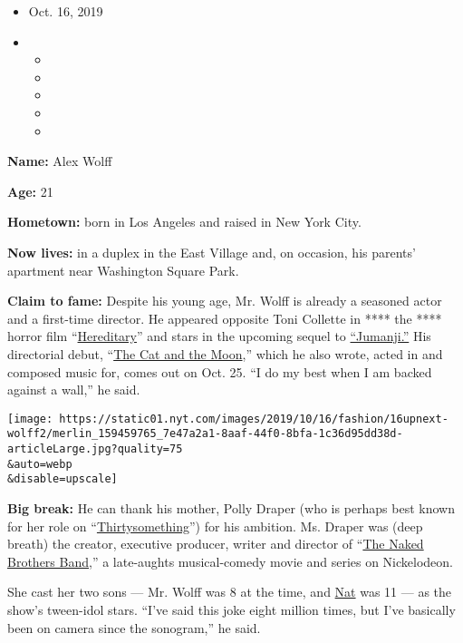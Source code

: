 \begin{itemize}
\item
  Oct. 16, 2019
\item
  \begin{itemize}
  \item
  \item
  \item
  \item
  \item
  \end{itemize}
\end{itemize}

\textbf{Name:} Alex Wolff

\textbf{Age:} 21

\textbf{Hometown:} born in Los Angeles and raised in New York City.

\textbf{Now lives:} in a duplex in the East Village and, on occasion,
his parents' apartment near Washington Square Park.

\textbf{Claim to fame:} Despite his young age, Mr. Wolff is already a
seasoned actor and a first-time director. He appeared opposite Toni
Collette in **** the **** horror film
``\href{https://www.nytimes.com/2018/06/07/movies/hereditary-review-toni-collette.html}{Hereditary}''
and stars in the upcoming sequel to
\href{https://collider.com/jumanji-3-cast-alex-wolff-madison-iseman/}{``Jumanji.''}
His directorial debut,
``\href{https://www.youtube.com/watch?v=tl2MnKEOXok}{The Cat and the
Moon},'' which he also wrote, acted in and composed music for, comes out
on Oct. 25. ``I do my best when I am backed against a wall,'' he said.

\texttt{[image: https://static01.nyt.com/images/2019/10/16/fashion/16upnext-wolff2/merlin\_159459765\_7e47a2a1-8aaf-44f0-8bfa-1c36d95dd38d-articleLarge.jpg?quality=75\\\&auto=webp\\\&disable=upscale]}

\textbf{Big break:} He can thank his mother, Polly Draper (who is
perhaps best known for her role on
``\href{https://www.nytimes.com/2009/08/21/arts/television/21thirty.html}{Thirtysomething}'')
for his ambition. Ms. Draper was (deep breath) the creator, executive
producer, writer and director of
``\href{https://www.nytimes.com/2007/01/25/arts/television/25nake.html}{The
Naked Brothers Band},'' a late-aughts musical-comedy movie and series on
Nickelodeon.

She cast her two sons --- Mr. Wolff was 8 at the time, and
\href{https://www.nytimes.com/2017/09/15/fashion/mens-style/nat-wolff-fault-in-our-stars-paper-towns.html}{Nat}
was 11 --- as the show's tween-idol stars. ``I've said this joke eight
million times, but I've basically been on camera since the sonogram,''
he said.

